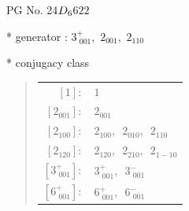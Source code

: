 \documentclass[fleqn,8pt]{jsarticle}
\begin{document}
\setcounter{MaxMatrixCols}{32}

\renewcommand{\tablename}{Table~}
\renewcommand{\figurename}{Figure~}
\begin{center}
\LARGE
PG No. 24\quad$D_{\rm 6}$\quad$622$\quad[ hexagonal ]
\end{center}

* generator : $3^{+}_{\,\,001},\,\,2{}_{001},\,\,2{}_{110}$

* conjugacy class
\begin{quote}
\begin{tabular}{rl}
$ [1]: $ & $ 1 $ \\
$ [2{}_{001}]: $ & $ 2{}_{001} $ \\
$ [2{}_{100}]: $ & $ 2{}_{100},\,\,\,2{}_{010},\,\,\,2{}_{110} $ \\
$ [2{}_{120}]: $ & $ 2{}_{120},\,\,\,2{}_{210},\,\,\,2{}_{1-10} $ \\
$ [3^{+}_{\,\,001}]: $ & $ 3^{+}_{\,\,001},\,\,\,3^{-}_{\,\,001} $ \\
$ [6^{+}_{\,\,001}]: $ & $ 6^{+}_{\,\,001},\,\,\,6^{-}_{\,\,001} $
\end{tabular}
\end{quote}
\end{document}
